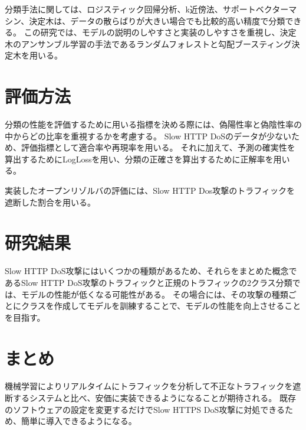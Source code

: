 \documentclass[twocolumn,article]{jlreq}
\begin{document}
分類手法に関しては、ロジスティック回帰分析、k近傍法、サポートベクターマシン、決定木は、データの散らばりが大きい場合でも比較的高い精度で分類できる。%
この研究では、モデルの説明のしやすさと実装のしやすさを重視し、決定木のアンサンブル学習の手法であるランダムフォレストと勾配ブースティング決定木を用いる。

\section{評価方法}
分類の性能を評価するために用いる指標を決める際には、偽陽性率と偽陰性率の中からどの比率を重視するかを考慮する。%
Slow HTTP DoSのデータが少ないため、評価指標として適合率や再現率を用いる。%
それに加えて、予測の確実性を算出するためにLogLossを用い、分類の正確さを算出するために正解率を用いる。%

実装したオープンリゾルバの評価には、Slow HTTP Dos攻撃のトラフィックを遮断した割合を用いる。

\section{研究結果}
Slow HTTP DoS攻撃にはいくつかの種類があるため、それらをまとめた概念であるSlow HTTP DoS攻撃のトラフィックと正規のトラフィックの2クラス分類では、モデルの性能が低くなる可能性がある。%
その場合には、その攻撃の種類ごとにクラスを作成してモデルを訓練することで、モデルの性能を向上させることを目指す。


\section{まとめ}
機械学習によりリアルタイムにトラフィックを分析して不正なトラフィックを遮断するシステムと比べ、安価に実装できるようになることが期待される。%
既存のソフトウェアの設定を変更するだけでSlow HTTPS DoS攻撃に対処できるため、簡単に導入できるようになる。

\printbibliography[title=参考文献]
\end{document}
